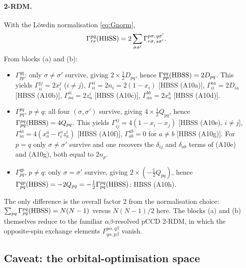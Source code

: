\documentclass[11pt,a4paper]{article}
\begin{document}
\paragraph{2-RDM.} With the L\"owdin normalisation \eqref{eq:Gnorm},
\begin{equation}
  \Gamma^{pq}_{rs}({\rm HBSS})=2\sum_{\sigma\sigma'}\Gamma^{p\sigma,\,q\sigma'}_{r\sigma,\,s\sigma'} .
\end{equation}
From blocks (a) and (b):
\begin{itemize}
\item $\Gamma^{qq}_{pp}$: only $\sigma\neq\sigma'$ survive, giving $2\times\tfrac12D_{pq}$, hence
  $\Gamma^{qq}_{pp}({\rm HBSS})=2D_{pq}$. This yields
  $\Gamma^{jj}_{ii}=2x^j_i$ ($i\neq j$), $\Gamma^{ii}_{ii}=2n_i=2(1-x_i)$ [HBSS (A10a)],
  $\Gamma^{aa}_{ii}=2D_{ia}$ [HBSS (A10b)], $\Gamma^{ii}_{aa}=2z^i_a$ [HBSS (A10c)],
  $\Gamma^{bb}_{aa}=2x^b_a$ [HBSS (A10d)].
\item $\Gamma^{pq}_{pq}$, $p\neq q$: all four $(\sigma,\sigma')$ survive, giving $4\times\tfrac12Q_{pq}$, hence
  $\Gamma^{pq}_{pq}({\rm HBSS})=4Q_{pq}$. This yields $\Gamma^{ij}_{ij}=4(1-x_i-x_j)$ [HBSS (A10e), $i\neq j$],
  $\Gamma^{ia}_{ia}=4(x^a_a-t^a_iz^i_a)$ [HBSS (A10f)], $\Gamma^{ab}_{ab}=0$ for $a\neq b$ [HBSS (A10g)].
  For $p=q$ only $\sigma\neq\sigma'$ survive and one recovers the $\delta_{ij}$ and $\delta_{ab}$ terms of
  (A10e) and (A10g), both equal to $2n_p$.
\item $\Gamma^{qp}_{pq}$, $p\neq q$: only $\sigma=\sigma'$ survive, giving $2\times(-\tfrac12Q_{pq})$, hence
  $\Gamma^{qp}_{pq}({\rm HBSS})=-2Q_{pq}=-\tfrac12\Gamma^{pq}_{pq}({\rm HBSS})$: HBSS (A10h).
\end{itemize}
The only difference is the overall factor $2$ from the normalisation choice:
$\sum_{pq}\Gamma^{pq}_{pq}({\rm HBSS})=N(N-1)$ versus $N(N-1)/2$ here.
The blocks (a) and (b) themselves reduce to the familiar $\alpha\beta$-resolved pCCD 2-RDM, in which
the opposite-spin exchange elements $\Gamma^{p\alpha,q\beta}_{q\alpha,p\beta}$ vanish.

\subsection{Caveat: the orbital-optimisation space}
\end{document}
